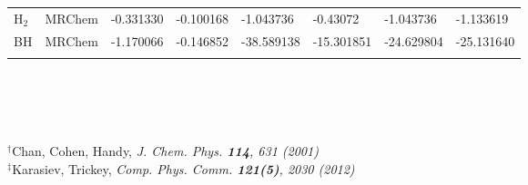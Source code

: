 \documentclass[mathserif, 8pt]{beamer}
\begin{document}
\begin{frame}
\begin{table}
\begin{center}
\begin{tabular}{ll|ll|llll}
H$_2$	& MRChem	    &  -0.331330    &  -0.100168    &   -1.043736   &  -0.43072     &   -1.043736   &   -1.133619   \\
BH	& MRChem	    &  -1.170066    &  -0.146852    &  -38.589138   & -15.301851    &  -24.629804   &  -25.131640   \\
	&		    &               &               &               &               &               &		    \\
\hline                                                                                  
\hline                                                                                  
\end{tabular}
\end{center}
\end{table}
\ \\
\ \\
\ \\
\ \\
\centering
$^\dag$\tiny{Chan, Cohen, Handy, \it{J. Chem. Phys.} \textbf{114}, 631 (2001)}\\
$^\ddag$\tiny{Karasiev, Trickey, \it{Comp. Phys. Comm.} \textbf{121(5)}, 2030 (2012)}
\end{frame}
\end{document}
